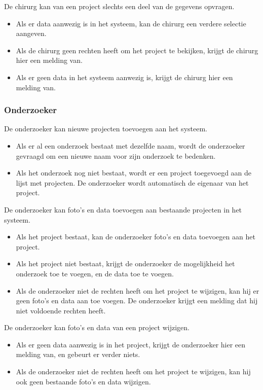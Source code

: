 De chirurg kan van een project slechts een deel van de gegevens opvragen.
\begin{itemize}
	\item Als er data aanwezig is in het systeem, kan de chirurg een verdere selectie aangeven.
	\item Als de chirurg geen rechten heeft om het project te bekijken, krijgt de chirurg hier een melding van.
	\item Als er geen data in het systeem aanwezig is, krijgt de chirurg hier een melding van.
\end{itemize}

\subsubsection{Onderzoeker}

De onderzoeker kan nieuwe projecten toevoegen aan het systeem.
\begin{itemize}
	\item Als er al een onderzoek bestaat met dezelfde naam, wordt de onderzoeker gevraagd om een nieuwe naam voor zijn onderzoek te bedenken.
	\item Als het onderzoek nog niet bestaat, wordt er een project toegevoegd aan de lijst met projecten. De onderzoeker wordt automatisch de eigenaar van het project.
\end{itemize}

De onderzoeker kan foto's en data toevoegen aan bestaande projecten in het systeem.
\begin{itemize}
	\item Als het project bestaat, kan de onderzoeker foto's en data toevoegen aan het project.
	\item Als het project niet bestaat, krijgt de onderzoeker de mogelijkheid het onderzoek toe te voegen, en de data toe te voegen.
	\item Als de onderzoeker niet de rechten heeft om het project te wijzigen, kan hij er geen foto's en data aan toe voegen. De onderzoeker krijgt een melding dat hij niet voldoende rechten heeft.
\end{itemize}

De onderzoeker kan foto's en data van een project wijzigen.
\begin{itemize}
  \item Als er geen data aanwezig is in het project, krijgt de onderzoeker hier een melding van, en gebeurt er verder niets.
	\item Als de onderzoeker niet de rechten heeft om het project te wijzigen, kan hij ook geen bestaande foto's en data wijzigen.
\end{itemize}

